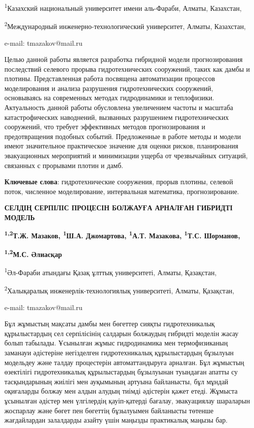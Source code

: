 \textsuperscript{1}Казахский национальный университет имени аль-Фараби,
Алматы, Казахстан,

\textsuperscript{2}Международный инженерно-технологический университет,
Алматы, Казахстан,

e-mail: tmazakov@mail.ru

Целью данной работы является разработка гибридной модели прогнозирования
последствий селевого прорыва гидротехнических сооружений, таких как
дамбы и плотины. Представленная работа посвящена автоматизации процессов
моделирования и анализа разрушения гидротехнических сооружений,
основываясь на современных методах гидродинамики и теплофизики.
Актуальность данной работы обусловлена увеличением частоты и масштаба
катастрофических наводнений, вызванных разрушением гидротехнических
сооружений, что требует эффективных методов прогнозирования и
предотвращения подобных событий. Предложенные в работе методы и модели
имеют значительное практическое значение для оценки рисков, планирования
эвакуационных мероприятий и минимизации ущерба от чрезвычайных ситуаций,
связанных с прорывами плотин и дамб.

\textbf{Ключевые слова}: гидротехнические сооружения, прорыв плотины,
селевой поток, численное моделирование, интервальная математика,
прогнозирование.

\textbf{СЕЛДІҢ СЕРПІЛІС ПРОЦЕСІН БОЛЖАУҒА АРНАЛҒАН ГИБРИДТІ МОДЕЛЬ}

\textbf{\textsuperscript{1,2}Т.Ж. Мазаков, \textsuperscript{1}Ш.А.
Джомартова, \textsuperscript{1}А.Т. Мазакова, \textsuperscript{1}Т.С.
Шорманов,}

\textbf{\textsuperscript{1,2}М.С. Әлиасқар}

\textsuperscript{1}Әл-Фараби атындағы Қазақ ұлттық университеті, Алматы,
Қазақстан,

\textsuperscript{2}Халықаралық инженерлік-технологиялық университеті,
Алматы, Қазақстан,

e-mail: tmazakov@mail.ru

Бұл жұмыстың мақсаты дамбы мен бөгеттер сияқты гидротехникалық
құрылыстардың сел серпілісінің салдарын болжаудың гибридті моделін жасау
болып табылады. Ұсынылған жұмыс гидродинамика мен термофизиканың
заманауи әдістеріне негізделген гидротехникалық құрылыстардың бұзылуын
модельдеу және талдау процестерін автоматтандыруға арналған. Бұл
жұмыстың өзектілігі гидротехникалық құрылыстардың бұзылуынан туындаған
апатты су тасқындарының жиілігі мен ауқымының артуына байланысты, бұл
мұндай оқиғаларды болжау мен алдын алудың тиімді әдістерін қажет етеді.
Жұмыста ұсынылған әдістер мен үлгілердің қауіп-қатерді бағалау,
эвакуациялау шараларын жоспарлау және бөгет пен бөгеттің бұзылуымен
байланысты төтенше жағдайлардан залалдарды азайту үшін маңызды
практикалық маңызы бар.

